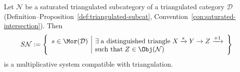 
\begin{proposition}
	Let $\mathcal{N}$ be a saturated triangulated subcategory of a
	triangulated category $\mathcal{D}$
	(Definition--Proposition~\ref{def:triangulated-subcat},
	Convention~\ref{con:saturated-intersection}). Then
	\[ S\mathcal{N} := \left\{\begin{array}{r|l}
		s \in \Mor(\mathcal{D}) & \exists \;\text{a distinguished triangle}\; X \xrightarrow{s} Y \to Z \xrightarrow{+1} \\
		& \text{such that}\; Z \in \Obj(\mathcal{N})
	\end{array}\right\} \]
	is a multiplicative system compatible with triangulation.
\end{proposition}

